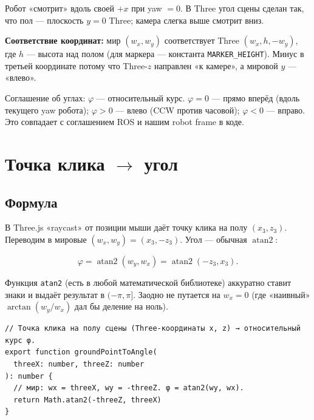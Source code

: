 Робот «смотрит» вдоль своей $+x$ при yaw $= 0$. В Three угол сцены
сделан так, что пол --- плоскость $y = 0$ Three; камера слегка выше
смотрит вниз.

\textbf{Соответствие координат:} мир $(w_x, w_y)$ соответствует Three
$(w_x, h, -w_y)$, где $h$ --- высота над полом (для маркера ---
константа \texttt{MARKER\_HEIGHT}). Минус в третьей координате потому
что Three-$z$ направлен «к камере», а мировой $y$ --- «влево».

\begin{notebox}
Соглашение об углах: $\varphi$ --- относительный курс. $\varphi = 0$
--- прямо вперёд (вдоль текущего yaw робота); $\varphi > 0$ --- влево
(CCW против часовой); $\varphi < 0$ --- вправо. Это совпадает с
соглашением ROS и нашим robot frame в коде.
\end{notebox}

\section{Точка клика \texorpdfstring{$\to$}{->} угол}

\subsection{Формула}

В Three.js «raycast» от позиции мыши даёт точку клика на полу
$(x_3, z_3)$. Переводим в мировые $(w_x, w_y) = (x_3, -z_3)$. Угол ---
обычная $\operatorname{atan2}$:

\begin{formulabox}[title={Угол от точки клика}]
\begin{equation}
  \varphi = \operatorname{atan2}(w_y, w_x) = \operatorname{atan2}(-z_3, x_3).
  \label{eq:click_to_angle}
\end{equation}
\end{formulabox}

Функция \texttt{atan2} (есть в любой математической библиотеке)
аккуратно ставит знаки и выдаёт результат в $(-\pi, \pi]$. Заодно
не путается на $w_x = 0$ (где «наивный» $\arctan(w_y/w_x)$ дал бы
деление на ноль).

\begin{codebox}[title={\filepath{compute\_node/frontend/src/lib/targetAngle.ts}}]
\begin{lstlisting}[style=tsstyle]
// Точка клика на полу сцены (Three-координаты x, z) → относительный курс φ.
export function groundPointToAngle(
  threeX: number, threeZ: number
): number {
  // мир: wx = threeX, wy = -threeZ. φ = atan2(wy, wx).
  return Math.atan2(-threeZ, threeX)
}
\end{lstlisting}
\end{codebox}

